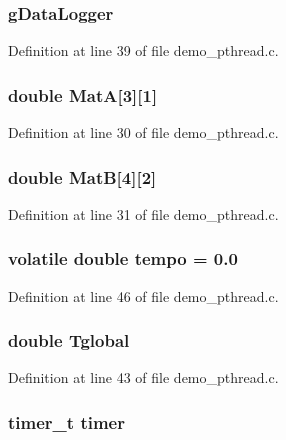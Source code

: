 \subsubsection[{gDataLogger}]{ {\bf gDataLogger}}\label{demo__pthread_8c_abe3b9c2c4e21e79c7b046b5986d13acc}


Definition at line 39 of file demo\_\-pthread.c.
\subsubsection[{MatA}]{\setlength{\rightskip}{0pt plus 5cm}double {\bf MatA}[3][1]}\label{demo__pthread_8c_a3437d43ee84dba8231980614a749bb3a}


Definition at line 30 of file demo\_\-pthread.c.
\subsubsection[{MatB}]{\setlength{\rightskip}{0pt plus 5cm}double {\bf MatB}[4][2]}\label{demo__pthread_8c_a778870de29c0389f060a5430a7a4f98a}


Definition at line 31 of file demo\_\-pthread.c.
\subsubsection[{tempo}]{\setlength{\rightskip}{0pt plus 5cm}volatile double {\bf tempo} = 0.0}\label{demo__pthread_8c_a4e5edfd50d3b15477cb4a7677022faec}


Definition at line 46 of file demo\_\-pthread.c.
\subsubsection[{Tglobal}]{\setlength{\rightskip}{0pt plus 5cm}double {\bf Tglobal}}\label{demo__pthread_8c_a8b54ca78cd2f458eea70b99ac6458d0a}


Definition at line 43 of file demo\_\-pthread.c.
\subsubsection[{timer}]{\setlength{\rightskip}{0pt plus 5cm}timer\_\-t {\bf timer}}\label{demo__pthread_8c_a1a1e2de3a80567484c9b4d4f20d5a3d0}


